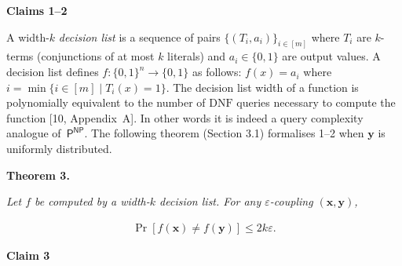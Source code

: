 \par\medskip\noindent\textbf{Claims 1–2
}\par




A width-$k$ \emph{decision list} is a sequence of pairs $\{(T_{i},a_{i})\}_{i\in[m]}$ where $T_{i}$ are $k$-terms (conjunctions of at most $k$ literals) and $a_{i}\in\{0,1\}$ are output values. A decision list defines $f\colon\{0,1\}^{n}\to\{0,1\}$ as follows: $f(x)=a_{i}$ where $i=\min\{i\in[m]\mid T_{i}(x)=1\}$. The decision list width of a function is polynomially equivalent to the number of $\mathrm{DNF}$ queries necessary to compute the function [10, Appendix A]. In other words it is indeed a query complexity analogue of $\textsf{P}^{\textsf{NP}}$. The following theorem (Section 3.1) formalises 1–2 when $\bm{y}$ is uniformly distributed.\par





\par\medskip\noindent\textbf{
\textbf{Theorem 3}\textbf{.}
}\par



\emph{Let $f$ be computed by a width-$k$ decision list. For any $\varepsilon$-coupling $(\bm{x},\bm{y})$,}\par


\[\begin{gathered}
\Pr[f(\bm{x})\neq f(\bm{y})]\leq 2k\varepsilon.
\end{gathered}\]







\par\medskip\noindent\textbf{Claim 3
}\par




